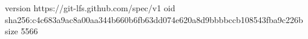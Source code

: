version https://git-lfs.github.com/spec/v1
oid sha256:c4c683a9ac8a00aa344b660b6fb63dd074e620a8d9bbbbccb108543fba9c226b
size 5566
